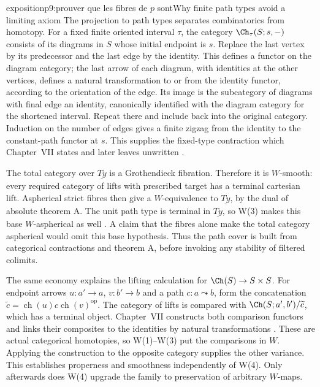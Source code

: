 \begin{dcomment}{exposition}{p9:prouver que les fibres de $p$ sont}{Why finite path types avoid a limiting axiom}
The projection to path types separates combinatorics from homotopy. For a fixed finite oriented interval \(\tau\), the category \(\Ch_\tau(S;s,-)\) consists of its diagrams in \(S\) whose initial endpoint is \(s\). Replace the last vertex by its predecessor and the last edge by the identity. This defines a functor on the diagram category; the last arrow of each diagram, with identities at the other vertices, defines a natural transformation to or from the identity functor, according to the orientation of the edge. Its image is the subcategory of diagrams with final edge an identity, canonically identified with the diagram category for the shortened interval. Repeat there and include back into the original category. Induction on the number of edges gives a finite zigzag from the identity to the constant-path functor at \(s\). This supplies the fixed-type contraction which Chapter~VII states and later leaves unwritten \citep[manuscript pp.~152, 160, 170]{GrothendieckDerivateursVII}.

The total category over \(\underline{Ty}\) is a Grothendieck fibration. Therefore it is \(W\)-smooth: every required category of lifts with prescribed target has a terminal cartesian lift. Aspherical strict fibres then give a \(W\)-equivalence to \(\underline{Ty}\), by the dual of absolute theorem A. The unit path type is terminal in \(\underline{Ty}\), so W(3) makes this base \(W\)-aspherical as well \citep[manuscript pp.~160--161]{GrothendieckDerivateursVII}. A claim that the fibres alone make the total category aspherical would omit this base hypothesis. Thus the path cover is built from categorical contractions and theorem A, before invoking any stability of filtered colimits.

The same economy explains the lifting calculation for
\(\Ch(S)\to S\times S\). For endpoint arrows \(u:a'\to a\), \(v:b'\to b\) and a path \(c:a\leadsto b\), form the concatenation \(\widetilde c=\operatorname{ch}(u)c\operatorname{ch}(v)^{\mathrm{op}}\). The category of lifts is compared with \(\Ch(S;a',b')/\widetilde c\), which has a terminal object. Chapter~VII constructs both comparison functors and links their composites to the identities by natural transformations \citep[manuscript pp.~161--166]{GrothendieckDerivateursVII}. These are actual categorical homotopies, so W(1)--W(3) put the comparisons in \(W\). Applying the construction to the opposite category supplies the other variance. This establishes properness and smoothness independently of W(4). Only afterwards does W(4) upgrade the family to preservation of arbitrary \(W\)-maps.


\end{dcomment}
